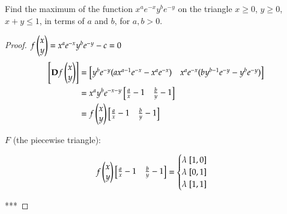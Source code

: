  Find the maximum of the function $x^a e^{-x} y^b e^{-y}$ on the triangle $x\geq 0$, $y\geq 0$, $x+y\leq 1$, in terms of $a$ and $b$, for $a,b>0$. 

\begin{proof}
	$f\begin{pmatrix} x \\ y \end{pmatrix} = x^a e^{-x} y^b e^{-y} - c = 0$
	\begin{align*}
		\begin{bmatrix} \textbf{D}f\begin{pmatrix} x \\ y \end{pmatrix} \end{bmatrix}&=\begin{bmatrix} y^b e^{-y}(ax^{a-1}e^{-x}-x^a e^{-x}) & x^a e^{-x}(by^{b-1}e^{-y}-y^be^{-y}) \end{bmatrix} \\
		&=x^a y^b e^{-x-y}\begin{bmatrix} \frac{a}{x}-1 & \frac{b}{y}-1 \end{bmatrix} \\
		&= f\begin{pmatrix} x \\ y \end{pmatrix}\begin{bmatrix} \frac{a}{x}-1 & \frac{b}{y}-1 \end{bmatrix}
	\end{align*}
	
	$F$ (the piecewise triangle): \\
	\begin{center}
	\usetikzlibrary{shapes.multipart}
	\end{center}
	
	\[f\begin{pmatrix} x \\ y \end{pmatrix}\begin{bmatrix} \frac{a}{x}-1 & \frac{b}{y}-1 \end{bmatrix}=\begin{cases}
\lambda\ [1, 0] \\
\lambda\ [0, 1] \\
\lambda\ [1, 1]	
\end{cases}\]

***

\end{proof}